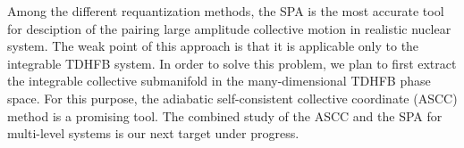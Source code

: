 \documentclass[%
superscriptaddress,
preprint,
showpacs,
nofootinbib,
amsmath,amssymb,
prc,
floatfix ]%
{revtex4-1}
\begin{document}

Among the different requantization methods,
the SPA is the most accurate tool for desciption of
the pairing large amplitude collective motion in realistic nuclear system.
The weak point of this approach is that it is applicable only to the
integrable TDHFB system.
In order to solve this problem, we plan to first extract the
integrable collective submanifold in the many-dimensional TDHFB phase space.
For this purpose, the adiabatic self-consistent collective coordinate (ASCC)
method \cite{NMMY16} is a promising tool.
The combined study of the ASCC and the SPA for multi-level systems is our
next target under progress.




\end{document}
